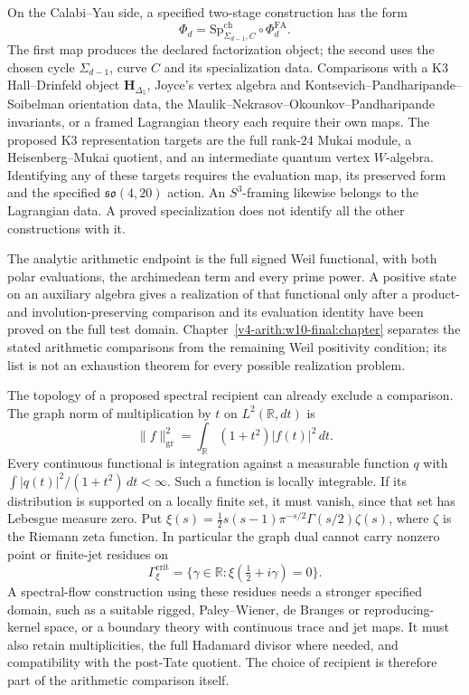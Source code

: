 On the Calabi--Yau side, a specified two-stage construction has the form
\[
 \Phi_d=\mathrm{Sp}^{\mathrm{ch}}_{\Sigma_{d-1},C}\circ
 \Phi^{\mathrm{FA}}_d.
\]
The first map produces the declared factorization object; the second
uses the chosen cycle \(\Sigma_{d-1}\), curve \(C\) and its
specialization data. Comparisons with a K3 Hall--Drinfeld object
\(\mathbf H_{\Delta_5}\), Joyce's vertex algebra and
Kontsevich--Pandharipande--Soibelman orientation data, the
Maulik--Nekrasov--Okounkov--Pandharipande invariants, or a framed
Lagrangian theory each require their own maps. The proposed K3
representation targets are the full rank-\(24\) Mukai module, a
Heisenberg--Mukai quotient, and an intermediate quantum vertex
\(W\)-algebra. Identifying any of these targets requires the
evaluation map, its preserved form and the specified
\(\mathfrak{so}(4,20)\) action. An \(S^3\)-framing likewise
belongs to the Lagrangian data. A proved specialization does not
identify all the other constructions with it.

The analytic arithmetic endpoint is the full signed Weil functional,
with both polar evaluations, the archimedean term and every prime power.
A positive state on an auxiliary algebra gives a realization of that
functional only after a product- and involution-preserving comparison
and its evaluation identity have been proved on the full test domain.
Chapter~\ref{v4-arith:w10-final:chapter} separates the stated arithmetic
comparisons from the remaining Weil positivity condition; its list is
not an exhaustion theorem for every possible realization problem.

The topology of a proposed spectral recipient can already exclude a
comparison. The graph norm of multiplication by \(t\) on
\(L^2(\mathbb R,dt)\) is
\[
 \|f\|_{\mathrm{gr}}^2
 =\int_{\mathbb R}(1+t^2)|f(t)|^2\,dt.
\]
Every continuous functional is integration against a measurable
function \(q\) with
\(\int |q(t)|^2/(1+t^2)\,dt<\infty\). Such a function is
locally integrable. If its distribution is supported on a locally
finite set, it must vanish, since that set has Lebesgue measure zero.
Put \(\xi(s)=\tfrac12s(s-1)\pi^{-s/2}\Gamma(s/2)\zeta(s)\),
where \(\zeta\) is the Riemann zeta function. In particular the
graph dual cannot carry nonzero point or finite-jet residues on
\[
 \Gamma_\xi^{\mathrm{crit}}
 =\{\gamma\in\mathbb R:\xi(\tfrac12+i\gamma)=0\}.
\]
A spectral-flow construction using these residues needs a stronger
specified domain, such as a suitable rigged, Paley--Wiener, de Branges
or reproducing-kernel space, or a boundary theory with continuous
trace and jet maps. It must also retain multiplicities, the full
Hadamard divisor where needed, and compatibility with the post-Tate
quotient. The choice of recipient is therefore part of the arithmetic
comparison itself.

